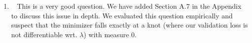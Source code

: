 \documentclass[]{article}
\newcommand{\reply}{\item[]\ }
\begin{document}
\begin{enumerate}
		\reply
		This is a very good question. We have added Section A.7 in the Appendix to discuss this issue in depth. We evaluated this question empirically and suspect that the minimizer falls exactly at a knot (where our validation loss is not differentiable wrt. $\lambda$) with measure $0$. 
		
%		
%		
		

\end{enumerate}
\end{document}
